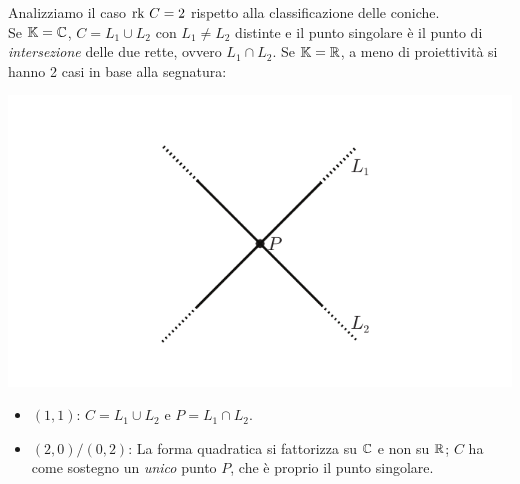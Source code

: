 \begin{observe}
\begin{itemize}
		\end{itemize}
\begin{minipage}{0.75\textwidth}
Analizziamo il caso $\mathrm{rk}\  C=2$ rispetto alla classificazione delle coniche.\\
Se $\mathbb{K}=\mathbb{C}$, $C=L_1\cup L_2$ con $L_1\neq L_2$ distinte e il punto singolare è il punto di \textit{intersezione} delle due rette, ovvero $L_1\cap L_2$.
Se $\mathbb{K}=\mathbb{R}$, a meno di proiettività si hanno 2 casi in base alla segnatura:
	\end{minipage}
	\hspace{-12mm}
	\begin{minipage}{0.24\textwidth}
		\includegraphics[trim=0cm 0cm 0cm 0cm,clip,scale=0.50]{images/planecurve4.pdf}
	\end{minipage}
\begin{itemize}
	\item $(1,1)$: $C=L_1\cup L_2$ e $P=L_1\cap L_2$.
	\item $(2,0)/(0,2)$: La forma quadratica si fattorizza su $\mathbb{C}$ e non su $\mathbb{R}$; $C$ ha come sostegno un \textit{unico} punto $P$, che è proprio il punto singolare.
\end{itemize}
\end{observe}
